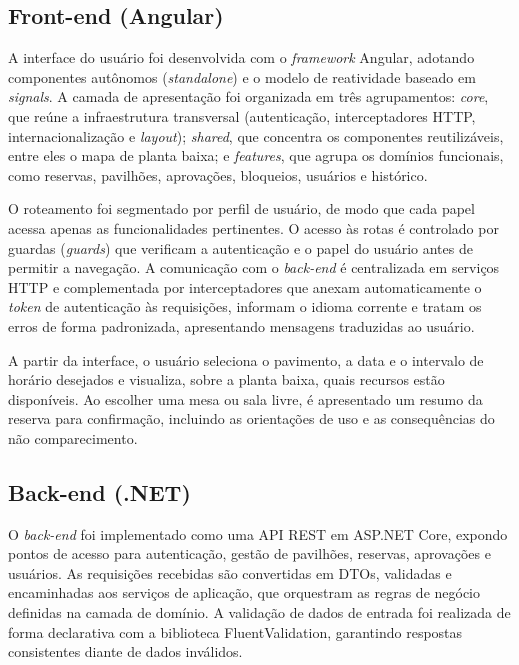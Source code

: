 \subsection{Front-end (Angular)}\label{subsec:angular}

A interface do usuário foi desenvolvida com o \textit{framework} Angular, adotando componentes autônomos (\textit{standalone}) e o modelo de reatividade baseado em \textit{signals}. %
A camada de apresentação foi organizada em três agrupamentos: \textit{core}, que reúne a infraestrutura transversal (autenticação, interceptadores HTTP, internacionalização e \textit{layout}); \textit{shared}, que concentra os componentes reutilizáveis, entre eles o mapa de planta baixa; e \textit{features}, que agrupa os domínios funcionais, como reservas, pavilhões, aprovações, bloqueios, usuários e histórico.

O roteamento foi segmentado por perfil de usuário, de modo que cada papel acessa apenas as funcionalidades pertinentes. O acesso às rotas é controlado por guardas (\textit{guards}) que verificam a autenticação e o papel do usuário antes de permitir a navegação. A comunicação com o \textit{back-end} é centralizada em serviços HTTP e complementada por interceptadores que anexam automaticamente o \textit{token} de autenticação às requisições, informam o idioma corrente e tratam os erros de forma padronizada, apresentando mensagens traduzidas ao usuário.

A partir da interface, o usuário seleciona o pavimento, a data e o intervalo de horário desejados e visualiza, sobre a planta baixa, quais recursos estão disponíveis. Ao escolher uma mesa ou sala livre, é apresentado um resumo da reserva para confirmação, incluindo as orientações de uso e as consequências do não comparecimento.

\subsection{Back-end (.NET)}\label{subsec:dotnet}

O \textit{back-end} foi implementado como uma API REST em ASP.NET Core, expondo pontos de acesso para autenticação, gestão de pavilhões, reservas, aprovações e usuários. As requisições recebidas são convertidas em DTOs, validadas e encaminhadas aos serviços de aplicação, que orquestram as regras de negócio definidas na camada de domínio. A validação de dados de entrada foi realizada de forma declarativa com a biblioteca FluentValidation, garantindo respostas consistentes diante de dados inválidos.

